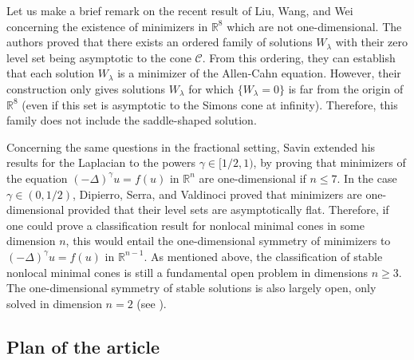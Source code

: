 \documentclass[12pt,reqno]{amsart}
\theoremstyle{definition}
\theoremstyle{remark}
\newcommand{\con}[1]{\mathbb{#1}}
\newcommand{\R}{\con{R}} %
\newcommand{\ccal}{\mathscr{C}}
\newcommand{\s}{\gamma}
\newcommand{\fraclaplacian}{(-\Delta)^\s}
\numberwithin{equation}{section}
\begin{document}
Let us make a brief remark on the recent result of Liu, Wang, and Wei \cite{LiuWangWei} concerning the existence of minimizers in $\R^8$ which are not one-dimensional. 
The authors proved that there exists an ordered family of solutions $W_\lambda$ with their zero level set being asymptotic to the cone $\ccal$. From this ordering, they can establish that each solution $W_\lambda$ is a minimizer of the Allen-Cahn equation. However, their construction only gives solutions $W_\lambda$ for which $\{W_\lambda = 0\}$ is far from the origin of $\R^8$ (even if this set is asymptotic to the Simons cone at infinity). Therefore, this family does not include the saddle-shaped solution.

Concerning the same questions in the fractional setting, Savin \cite{Savin-Fractional, Savin-Fractional2} extended his results for the Laplacian to the powers $\s \in [1/2,1)$, by proving that minimizers of the equation $\fraclaplacian u = f(u)$ in $\R^n$ are one-dimensional if $n\leq 7$. In the case $\s \in (0,1/2)$, Dipierro, Serra, and Valdinoci \cite{DipierroSerraValdinoci} proved that minimizers are one-dimensional provided that their level sets are asymptotically flat. Therefore, if one could prove a classification result for nonlocal minimal cones in some dimension $n$, this would entail the one-dimensional symmetry of minimizers to $\fraclaplacian u = f(u)$ in $\R^{n-1}$. As mentioned above, the classification of stable nonlocal minimal cones is still a fundamental open problem in dimensions $n\geq 3$. The one-dimensional symmetry of stable solutions is also largely open, only solved in dimension $n=2$ (see \cite{CabreSolaMorales, CabreSireII}). %


\subsection{Plan of the article}
\label{Subsec:Plan}
\end{document}
